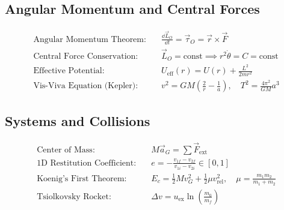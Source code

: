 \subsection{Angular Momentum and Central Forces}
\begin{align*}
\text{Angular Momentum Theorem:}\quad & \frac{\dd\vec{L}_O}{\dd t} = \vec{\tau}_O = \vec{r}\times\vec{F} \\
\text{Central Force Conservation:}\quad & \vec{L}_O = \text{const} \implies r^2\dot{\theta} = C = \text{const} \\
\text{Effective Potential:}\quad & U_{\text{eff}}(r) = U(r) + \frac{L^2}{2mr^2} \\
\text{Vis-Viva Equation (Kepler):}\quad & v^2 = GM\left(\frac{2}{r} - \frac{1}{a}\right), \quad T^2 = \frac{4\pi^2}{GM}a^3
\end{align*}

\subsection{Systems and Collisions}
\begin{align*}
\text{Center of Mass:}\quad & M\vec{a}_G = \sum\vec{F}_{\text{ext}} \\
\text{1D Restitution Coefficient:}\quad & e = -\frac{v_{1f} - v_{2f}}{v_{1i} - v_{2i}} \in [0, 1] \\
\text{Koenig's First Theorem:}\quad & E_c = \frac{1}{2}M v_G^2 + \frac{1}{2}\mu v_{\text{rel}}^2, \quad \mu = \frac{m_1 m_2}{m_1 + m_2} \\
\text{Tsiolkovsky Rocket:}\quad & \Delta v = u_{\text{ex}}\ln\left(\frac{m_0}{m_f}\right)
\end{align*}
